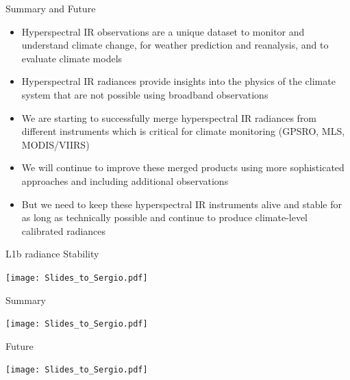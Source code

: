 \documentclass[10pt,t]{beamer}
\begin{document}
\begin{frame}{Summary and Future}
\begin{itemize}

\item Hyperspectral IR observations are a unique dataset to monitor
  and understand climate change, for weather prediction and
  reanalysis, and to evaluate climate models

\item Hyperspectral IR radiances provide insights into the physics of
  the climate system that are not possible using broadband
  observations

\item We are starting to successfully merge hyperspectral IR radiances
  from different instruments which is critical for climate monitoring
  (GPSRO, MLS, MODIS/VIIRS)

\item We will continue to improve these merged products using more
  sophisticated approaches and including additional observations

\item But we need to keep these hyperspectral IR instruments alive and
  stable for as long as technically possible and continue to produce
  climate-level calibrated radiances

\end{itemize}
\end{frame}
\begin{frame}{L1b radiance Stability}
\vspace{-0.35in}
\begin{center}
\texttt{[image: Slides\_to\_Sergio.pdf]}
\end{center}
\end{frame}

\begin{frame}{Summary}
\vspace{-0.35in}
\begin{center}
\texttt{[image: Slides\_to\_Sergio.pdf]}
\end{center}
\end{frame}

\begin{frame}{Future}
\vspace{-0.35in}
\begin{center}
\texttt{[image: Slides\_to\_Sergio.pdf]}
\end{center}
\end{frame}
\end{document}

